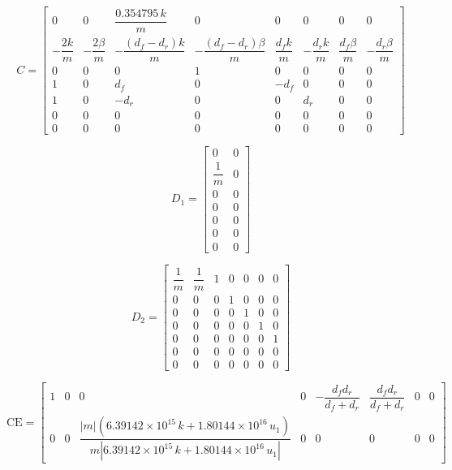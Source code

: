 \documentclass[]{report}
\begin{document}
\begin{equation}
	C =
	\begin{bmatrix}
		0 & 0 & \dfrac{0.354795\,k}{m} & 0 & 0 & 0 & 0 & 0 \\
		-\dfrac{2k}{m} & -\dfrac{2\beta}{m} & -\dfrac{(d_f - d_r)k}{m} & -\dfrac{(d_f - d_r)\beta}{m} & \dfrac{d_fk}{m} & -\dfrac{d_rk}{m} & \dfrac{d_f\beta}{m} & -\dfrac{d_r\beta}{m} \\
		0 & 0 & 0 & 1 & 0 & 0 & 0 & 0 \\
		1 & 0 & d_f & 0 & -d_f & 0 & 0 & 0 \\
		1 & 0 & -d_r & 0 & 0 & d_r & 0 & 0 \\
		0 & 0 & 0 & 0 & 0 & 0 & 0 & 0 \\
		0 & 0 & 0 & 0 & 0 & 0 & 0 & 0
	\end{bmatrix}
\end{equation}

\begin{equation}
	D_1 =
	\begin{bmatrix}
		0 & 0 \\
		\dfrac{1}{m} & 0 \\
		0 & 0 \\
		0 & 0 \\
		0 & 0 \\
		0 & 0 \\
		0 & 0
	\end{bmatrix}
\end{equation}

\begin{equation}
	D_2 =
	\begin{bmatrix}
		\dfrac{1}{m} & \dfrac{1}{m} & 1 & 0 & 0 & 0 & 0 \\
		0 & 0 & 0 & 1 & 0 & 0 & 0 \\
		0 & 0 & 0 & 0 & 1 & 0 & 0 \\
		0 & 0 & 0 & 0 & 0 & 1 & 0 \\
		0 & 0 & 0 & 0 & 0 & 0 & 1 \\
		0 & 0 & 0 & 0 & 0 & 0 & 0 \\
		0 & 0 & 0 & 0 & 0 & 0 & 0
	\end{bmatrix}
\end{equation}

\begin{equation}
	\mathrm{CE} =
	\begin{bmatrix}
		1 & 0 & 0 & 0 & -\dfrac{d_f d_r}{d_f + d_r} & \dfrac{d_f d_r}{d_f + d_r} & 0 & 0 \\
		0 & 0 & \dfrac{|m|(6.39142 \times 10^{15}\,k + 1.80144 \times 10^{16}\,u_1)}{m \left|6.39142 \times 10^{15}\,k + 1.80144 \times 10^{16}\,u_1\right|} & 0 & 0 & 0 & 0 & 0
	\end{bmatrix}
\end{equation}
\end{document}

